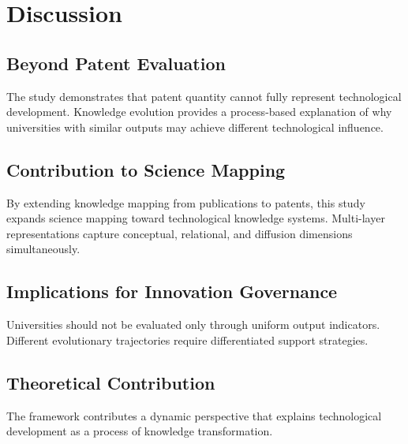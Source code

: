
\section{Discussion}

\subsection{Beyond Patent Evaluation}

The study demonstrates that patent quantity cannot fully represent technological development. Knowledge evolution provides a process-based explanation of why universities with similar outputs may achieve different technological influence.

\subsection{Contribution to Science Mapping}

By extending knowledge mapping from publications to patents, this study expands science mapping toward technological knowledge systems. Multi-layer representations capture conceptual, relational, and diffusion dimensions simultaneously.

\subsection{Implications for Innovation Governance}

Universities should not be evaluated only through uniform output indicators. Different evolutionary trajectories require differentiated support strategies.

\subsection{Theoretical Contribution}

The framework contributes a dynamic perspective that explains technological development as a process of knowledge transformation.
